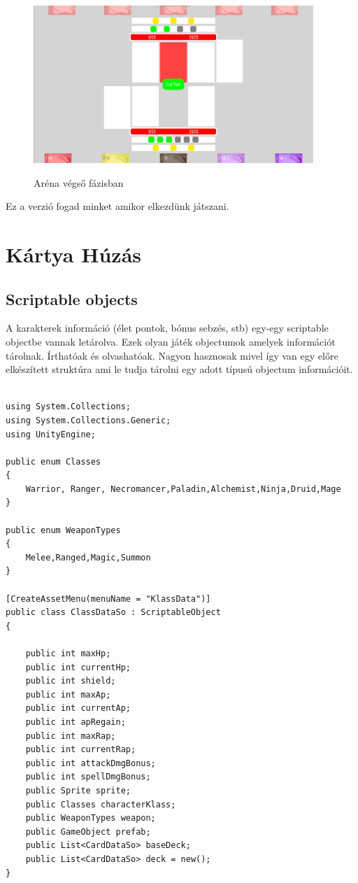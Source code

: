 \begin{figure}[h]
        \centering
        \includegraphics[width=400px,keepaspectratio]{images/image.png}
        \label{ArenaFinal}
        \caption {Aréna végső fázisban}
    \hspace{1em}
\end{figure}

Ez a verzió fogad minket amikor elkezdünk játszani.

\clearpage

\section{Kártya Húzás}
\subsection{Scriptable objects}
A karakterek információ (élet pontok, bónus sebzés, stb) egy-egy scriptable objectbe vannak letárolva. Ezek olyan játék objectumok amelyek információt tárolnak. Írthatóak és olvashatóak. Nagyon hasznosak mivel így van egy előre elkészített struktúra ami le tudja tárolni egy adott típusú objectum információit.
\\\
\begin{lstlisting}[language=CSharp,style=CSharpBase,caption={A Klass Scriptable Object kódja}]
using System.Collections;
using System.Collections.Generic;
using UnityEngine;

public enum Classes
{
    Warrior, Ranger, Necromancer,Paladin,Alchemist,Ninja,Druid,Mage
}

public enum WeaponTypes 
{
    Melee,Ranged,Magic,Summon
}

[CreateAssetMenu(menuName = "KlassData")]
public class ClassDataSo : ScriptableObject
{

    public int maxHp;
    public int currentHp;
    public int shield;
    public int maxAp;
    public int currentAp;
    public int apRegain;
    public int maxRap;
    public int currentRap;
    public int attackDmgBonus;
    public int spellDmgBonus;
    public Sprite sprite;
    public Classes characterKlass;
    public WeaponTypes weapon;
    public GameObject prefab;
    public List<CardDataSo> baseDeck;
    public List<CardDataSo> deck = new();
}
\end{lstlisting}

